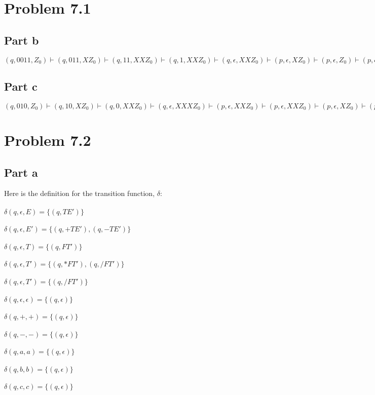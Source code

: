\documentclass{article}%
\begin{document}
\section*{Problem 7.1}

\subsection*{Part b}

$(q, 0011, Z_0) \vdash (q, 011, XZ_0) \vdash (q, 11, XXZ_0) \vdash (q, 1, XXZ_0) \vdash (q, \epsilon, XXZ_0) \vdash (p, \epsilon, XZ_0) \vdash (p, \epsilon, Z_0) \vdash (p, \epsilon, \epsilon)$

\subsection*{Part c}

$(q, 010, Z_0) \vdash (q, 10, XZ_0) \vdash (q, 0, XXZ_0) \vdash (q, \epsilon, XXXZ_0) \vdash (p, \epsilon, XXZ_0) \vdash (p, \epsilon, XXZ_0) \vdash (p, \epsilon, XZ_0) \vdash (p, \epsilon, Z_0) \vdash (p, \epsilon, \epsilon)$

\section*{Problem 7.2}
\subsection*{Part a}

Here is the definition for the transition function, $\delta$:\\
\\
$\delta(q, \epsilon, E) = \{(q, TE')\}$\\
\\
$\delta(q, \epsilon, E') = \{(q, +TE'), (q, -TE')\}$\\
\\
$\delta(q, \epsilon, T) = \{(q, FT')\}$\\
\\
$\delta(q, \epsilon, T') = \{(q, *FT'), (q, /FT')\}$\\
\\
$\delta(q, \epsilon, T') = \{(q, /FT')\}$\\
\\
$\delta(q, \epsilon, \epsilon) = \{(q, \epsilon)\}$\\
\\
$\delta(q, +, +) = \{(q, \epsilon)\}$\\
\\
$\delta(q, -, -) = \{(q, \epsilon)\}$\\
\\
$\delta(q, a, a) = \{(q, \epsilon)\}$\\
\\
$\delta(q, b, b) = \{(q, \epsilon)\}$\\
\\
$\delta(q, c, c) = \{(q, \epsilon)\}$\\
\\
\end{document}
